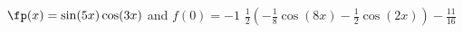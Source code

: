 {$\fp(x) = \sin(5x)\cos(3x)$ and $f(0)= -1$
}
{$\frac12\left(-\frac18\cos(8x)-\frac12\cos(2x)\right)-\frac{11}{16}$
}

